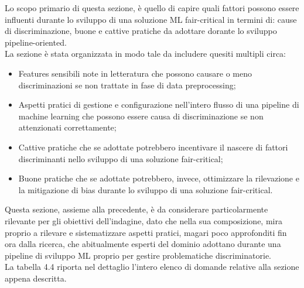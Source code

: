    Lo scopo primario di questa sezione, è quello di capire quali fattori possono essere influenti durante lo sviluppo di una soluzione ML fair-critical in termini di: cause di discriminazione, buone e cattive pratiche da adottare dorante lo sviluppo pipeline-oriented.\\
   La sezione è stata organizzata in modo tale da includere quesiti multipli circa:
   
   \begin{itemize}
       \item Features sensibili note in letteratura che possono causare o meno discriminazioni se non trattate in fase di data preprocessing;
       \item Aspetti pratici di gestione e configurazione nell'intero flusso di una pipeline di machine learning che possono essere causa di discriminazione se non attenzionati correttamente;
       \item Cattive pratiche che se adottate potrebbero incentivare il nascere di fattori discriminanti nello sviluppo di una soluzione fair-critical;
       \item Buone pratiche che se adottate potrebbero, invece, ottimizzare la rilevazione e la mitigazione di bias durante lo sviluppo di una soluzione fair-critical.
   \end{itemize}
   
  Questa sezione, assieme alla precedente, è da considerare particolarmente rilevante per gli obiettivi dell'indagine, dato che nella sua composizione, mira proprio a rilevare e sistematizzare aspetti pratici, magari poco approfonditi fin ora dalla ricerca, che abitualmente esperti del dominio adottano durante una pipeline di sviluppo ML proprio per gestire problematiche discriminatorie.\\
  
  La tabella 4.4 riporta nel dettaglio l'intero elenco di domande relative alla sezione appena descritta.
   
